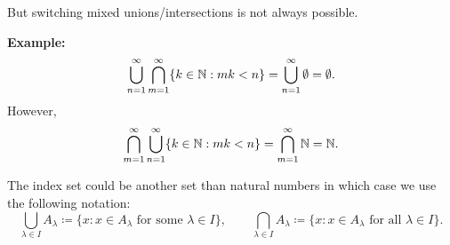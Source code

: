 \documentclass[10pt,aspectratio=169]{beamer}
\begin{document}
\begin{frame}
But switching mixed unions/intersections is not always possible.

\medskip
\pause

\textbf{Example:}
\begin{equation*}
\bigcup_{n=1}^\infty
\bigcap_{m=1}^\infty
\{ k \in {\mathbb{N}} : mk < n \}
=
\bigcup_{n=1}^\infty \emptyset = \emptyset .
\end{equation*}
\pause
However,
\begin{equation*}
\bigcap_{m=1}^\infty
\bigcup_{n=1}^\infty
\{ k \in {\mathbb{N}} : mk < n \}
=
\bigcap_{m=1}^\infty
{\mathbb{N}}
=
{\mathbb{N}}.
\end{equation*}

\pause
The index set could be another set than natural numbers in which case we use
the following notation:
\begin{equation*}
\bigcup_{\lambda \in I} A_\lambda \coloneqq \{ x : x \in A_\lambda \text{ for some }
\lambda \in I
\} ,
\qquad
\bigcap_{\lambda \in I} A_\lambda \coloneqq \{ x : x \in A_\lambda \text{ for all }
\lambda \in I
\} .
\end{equation*}

\end{frame}
\end{document}
